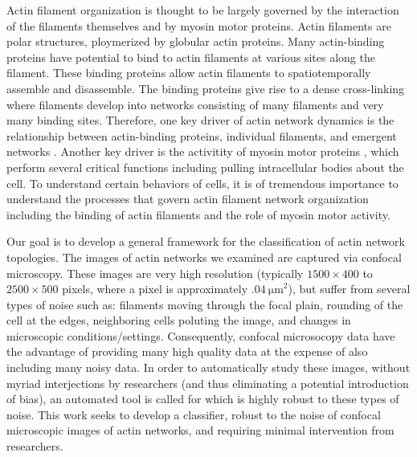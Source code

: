 \documentclass[10pt]{article}
\begin{document}
Actin filament organization is thought to be largely governed by the interaction of the filaments themselves and by myosin motor proteins. Actin filaments are polar structures, ploymerized by globular actin proteins. Many actin-binding proteins have potential to bind to actin filaments at various sites along the filament. These binding proteins allow actin filaments to spatiotemporally assemble and disassemble. The binding proteins give rise to a dense cross-linking where filaments develop into networks consisting of many filaments and very many binding sites. Therefore, one key driver of actin network dynamics  is the relationship between actin-binding proteins, individual filaments, and emergent networks \cite{freedman2017versatile,freedman2018nonequilibrium}. Another key driver is the activitity of myosin motor proteins \cite{ueda2010myosin,madison2015class,peremyslov2010class,park2013myosin}, which perform several critical functions including pulling intracellular bodies about the cell. To understand certain behaviors of cells, it is of tremendous importance to understand the processes that govern actin filament network organization including the binding of actin filaments and the role of myosin motor activity.

Our goal is to develop a general framework for the classification of actin network topologies. The images of actin networks we examined are captured via confocal microscopy. These images are very high resolution (typically $1500\times400$ to $2500\times500$ pixels, where a pixel is approximately $\SI{.04}{\micro\metre}^2$), but suffer from several types of noise such as: filaments moving through the focal plain, rounding of the cell at the edges, neighboring cells poluting the image, and changes in microscopic conditions/settings. Consequently, confocal microsocopy data have the advantage of providing many high quality data at the expense of also including many noisy data. In order to automatically study these images, without myriad interjections by researchers (and thus eliminating a potential introduction of bias), an automated tool is called for which is highly robust to these types of noise. This work seeks to develop a classifier, robust to the noise of confocal microscopic images of actin networks, and requiring minimal intervention from researchers.
\end{document}
